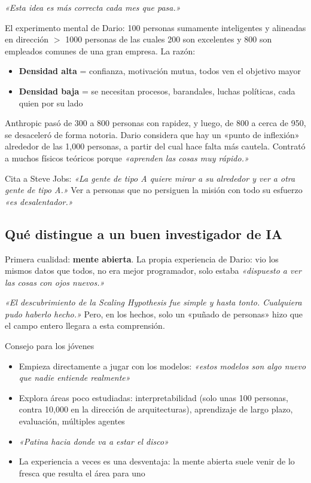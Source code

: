 \textit{«Esta idea es más correcta cada mes que pasa.»}

El experimento mental de Dario: 100 personas sumamente inteligentes y alineadas en dirección $>$ 1000 personas de las cuales 200 son excelentes y 800 son empleados comunes de una gran empresa. La razón:

\begin{itemize}
    \item \textbf{Densidad alta} = confianza, motivación mutua, todos ven el objetivo mayor
    \item \textbf{Densidad baja} = se necesitan procesos, barandales, luchas políticas, cada quien por su lado
\end{itemize}

Anthropic pasó de 300 a 800 personas con rapidez, y luego, de 800 a cerca de 950, se desaceleró de forma notoria. Dario considera que hay un «punto de inflexión» alrededor de las 1,000 personas, a partir del cual hace falta más cautela. Contrató a muchos físicos teóricos porque \textit{«aprenden las cosas muy rápido.»}

Cita a Steve Jobs: \textit{«La gente de tipo A quiere mirar a su alrededor y ver a otra gente de tipo A.»} Ver a personas que no persiguen la misión con todo su esfuerzo \textit{«es desalentador.»}

\subsection{Qué distingue a un buen investigador de IA}

Primera cualidad: \textbf{mente abierta}. La propia experiencia de Dario: vio los mismos datos que todos, no era mejor programador, solo estaba \textit{«dispuesto a ver las cosas con ojos nuevos.»}

\textit{«El descubrimiento de la Scaling Hypothesis fue simple y hasta tonto. Cualquiera pudo haberlo hecho.»} Pero, en los hechos, solo un «puñado de personas» hizo que el campo entero llegara a esta comprensión.

\begin{knowledgebox}{Consejo para los jóvenes}
\begin{itemize}
    \item Empieza directamente a jugar con los modelos: \textit{«estos modelos son algo nuevo que nadie entiende realmente»}
    \item Explora áreas poco estudiadas: interpretabilidad (solo unas 100 personas, contra 10,000 en la dirección de arquitecturas), aprendizaje de largo plazo, evaluación, múltiples agentes
    \item \textit{«Patina hacia donde va a estar el disco»}
    \item La experiencia a veces es una desventaja: la mente abierta suele venir de lo fresca que resulta el área para uno
\end{itemize}
\end{knowledgebox}

